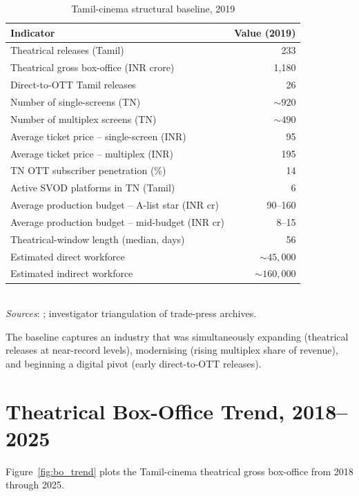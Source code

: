\begin{table}[h]
\centering
\caption{Tamil-cinema structural baseline, 2019}
\label{tab:baseline2019}
\small
\begin{tabular}{p{6.5cm} r}
\toprule
\textbf{Indicator} & \textbf{Value (2019)}\\
\midrule
Theatrical releases (Tamil)              & 233 \\
Theatrical gross box-office (INR crore)  & 1{,}180 \\
Direct-to-OTT Tamil releases             & 26 \\
Number of single-screens (TN)            & ${\sim}920$ \\
Number of multiplex screens (TN)         & ${\sim}490$ \\
Average ticket price -- single-screen (INR) & 95 \\
Average ticket price -- multiplex (INR)     & 195 \\
TN OTT subscriber penetration (\%)       & 14 \\
Active SVOD platforms in TN (Tamil)      & 6 \\
Average production budget -- A-list star (INR cr) & 90--160 \\
Average production budget -- mid-budget (INR cr)  & 8--15 \\
Theatrical-window length (median, days)  & 56 \\
Estimated direct workforce               & ${\sim}45{,}000$ \\
Estimated indirect workforce             & ${\sim}160{,}000$ \\
\bottomrule
\end{tabular}
\\\smallskip
\textit{Sources}: \citet{ficciey2020,ormax2022,kohlikhandekar2013,
ravindran2018}; investigator triangulation of trade-press archives.
\end{table}

The baseline captures an industry that was simultaneously expanding
(theatrical releases at near-record levels), modernising (rising
multiplex share of revenue), and beginning a digital pivot (early
direct-to-OTT releases).

\section{Theatrical Box-Office Trend, 2018--2025}
\label{sec:bo_trend}

Figure~\ref{fig:bo_trend} plots the Tamil-cinema theatrical gross
box-office from 2018 through 2025.

